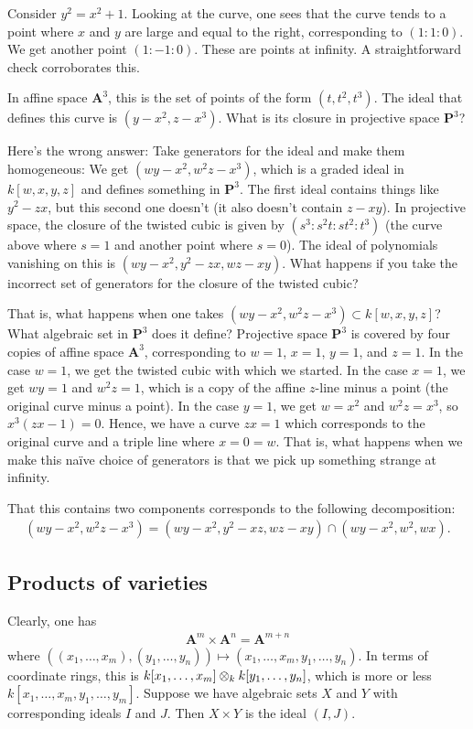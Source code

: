 \documentclass [11 pt, oneside, margin = 1 in] {article}
\begin{document}
\begin{example}[ ]\label{}\text{}
Consider $y^2 = x^2 + 1$. Looking at the curve, one sees that the curve tends to a point where $x$ and $y$ are large and equal to the right, corresponding to $(1:1:0)$. We get another point $(1:-1:0)$. These are points at infinity. A straightforward check corroborates this. 
\end{example}

\begin{example}\label{}\text{}
In affine space $\mathbf{A}^3$, this is the set of points of the form $(t,t^2,t^3)$. The ideal that defines this curve is $(y-x^2, z-x^3)$. What is its closure in projective space $\mathbf{P}^3$?

Here's the wrong answer: Take generators for the ideal and make them homogeneous: We get $ (wy-x^2,w^2z-x^3)$, which is a graded ideal in $k[w,x,y,z]$ and defines something in $\mathbf{P}^3$. The first ideal contains things like $y^2-zx$, but this second one doesn't (it also doesn't contain $z-xy$). In projective space, the closure of the twisted cubic is given by $(s^3:s^2t:st^2:t^3)$ (the curve above where $s=1$ and another point where $s=0$). The ideal of polynomials vanishing on this is $(wy-x^2, y^2-zx, wz- xy)$. What happens if you take the incorrect set of generators for the closure of the twisted cubic?

That is, what happens when one takes $(wy-x^2, w^2z - x^3) \subset k[w,x,y,z]$? What algebraic set in $\mathbf{P}^3$ does it define? Projective space $\mathbf{P}^3$ is covered by four copies of affine space $\mathbf{A}^3$, corresponding to $w=1$, $x=1$, $y=1$, and $z=1$. In the case $w=1$, we get the twisted cubic with which we started. In the case $x=1$, we get $wy=1$ and $w^2z = 1$, which is a copy of the affine $z$-line minus a point (the original curve minus a point). In the case $y=1$, we get $w=x^2$ and $w^2z=x^3$, so $x^3(zx-1)=0$. Hence, we have a curve $zx=1$ which corresponds to the original curve and a triple line where $x=0=w$. That is, what happens when we make this na\"ive choice of generators is that we pick up something strange at infinity.

That this contains two components corresponds to the following decomposition:
\begin{align*}
	(wy-x^2, w^2z - x^3) = (wy-x^2,y^2-xz, wz-xy) \cap  (wy-x^2, w^2, wx).
\end{align*}
\end{example}

\subsection{Products of varieties}
Clearly, one has
\begin{align*}
	\mathbf{A}^m \times \mathbf{A}^n = \mathbf{A}^{m+n}
\end{align*}
where $((x_1,\hdots,x_m),(y_1,\hdots,y_n))\longmapsto  (x_1,\hdots, x_m,y_1,\hdots, y_n)$. In terms of coordinate rings, this is $k[x_1,\hdots,x_m]\otimes_k k[y_1,\hdots, y_n]$, which is more or less $k[x_1,\hdots, x_m,y_1,\hdots, y_m]$. Suppose we have algebraic sets $X$ and $Y$ with corresponding ideals $I$ and $J$. Then $X\times Y$ is the ideal $(I,J)$.
\end{document}
